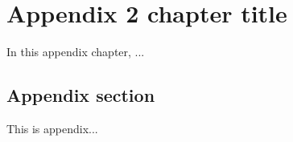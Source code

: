 \chapter{Appendix 2 chapter title}
\label{app:appx2}

In this appendix chapter, ...

\section{Appendix section}
This is appendix...

